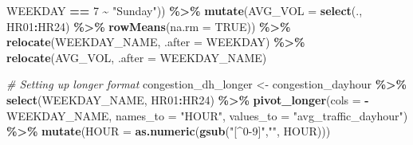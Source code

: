 \documentclass[
  12pt,
]{article}
\newenvironment{Shaded}{\begin{snugshade}}{\end{snugshade}}
\newcommand{\AttributeTok}[1]{\textcolor[rgb]{0.13,0.29,0.53}{#1}}
\newcommand{\CommentTok}[1]{\textcolor[rgb]{0.56,0.35,0.01}{\textit{#1}}}
\newcommand{\ConstantTok}[1]{\textcolor[rgb]{0.56,0.35,0.01}{#1}}
\newcommand{\DecValTok}[1]{\textcolor[rgb]{0.00,0.00,0.81}{#1}}
\newcommand{\FunctionTok}[1]{\textcolor[rgb]{0.13,0.29,0.53}{\textbf{#1}}}
\newcommand{\NormalTok}[1]{#1}
\newcommand{\OtherTok}[1]{\textcolor[rgb]{0.56,0.35,0.01}{#1}}
\newcommand{\SpecialCharTok}[1]{\textcolor[rgb]{0.81,0.36,0.00}{\textbf{#1}}}
\newcommand{\StringTok}[1]{\textcolor[rgb]{0.31,0.60,0.02}{#1}}
\begin{document}
\begin{Shaded}
\begin{Highlighting}[]
\NormalTok{    WEEKDAY }\SpecialCharTok{==} \DecValTok{7} \SpecialCharTok{\textasciitilde{}} \StringTok{"Sunday"}\NormalTok{)) }\SpecialCharTok{\%\textgreater{}\%}
  \FunctionTok{mutate}\NormalTok{(}\AttributeTok{AVG\_VOL =} \FunctionTok{select}\NormalTok{(., HR01}\SpecialCharTok{:}\NormalTok{HR24) }\SpecialCharTok{\%\textgreater{}\%} \FunctionTok{rowMeans}\NormalTok{(}\AttributeTok{na.rm =} \ConstantTok{TRUE}\NormalTok{)) }\SpecialCharTok{\%\textgreater{}\%}
  \FunctionTok{relocate}\NormalTok{(WEEKDAY\_NAME, }\AttributeTok{.after =}\NormalTok{ WEEKDAY) }\SpecialCharTok{\%\textgreater{}\%}
  \FunctionTok{relocate}\NormalTok{(AVG\_VOL, }\AttributeTok{.after =}\NormalTok{ WEEKDAY\_NAME)}

\CommentTok{\# Setting up longer format}
\NormalTok{congestion\_dh\_longer }\OtherTok{\textless{}{-}}\NormalTok{ congestion\_dayhour }\SpecialCharTok{\%\textgreater{}\%}
  \FunctionTok{select}\NormalTok{(WEEKDAY\_NAME, HR01}\SpecialCharTok{:}\NormalTok{HR24) }\SpecialCharTok{\%\textgreater{}\%}
  \FunctionTok{pivot\_longer}\NormalTok{(}\AttributeTok{cols =} \SpecialCharTok{{-}}\NormalTok{WEEKDAY\_NAME,}
               \AttributeTok{names\_to =} \StringTok{"HOUR"}\NormalTok{,}
               \AttributeTok{values\_to =} \StringTok{"avg\_traffic\_dayhour"}\NormalTok{) }\SpecialCharTok{\%\textgreater{}\%}
  \FunctionTok{mutate}\NormalTok{(}\AttributeTok{HOUR =} \FunctionTok{as.numeric}\NormalTok{(}\FunctionTok{gsub}\NormalTok{(}\StringTok{"[\^{}0{-}9]"}\NormalTok{,}\StringTok{""}\NormalTok{, HOUR)))}
\end{Highlighting}
\end{Shaded}
\end{document}

